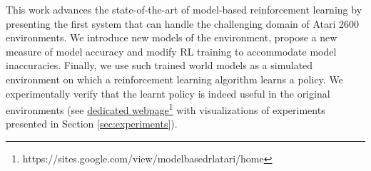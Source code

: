This work advances the state-of-the-art of model-based reinforcement learning by presenting the first system that can handle the challenging domain of Atari 2600 environments. We introduce new models of the environment, propose a new measure of model accuracy and modify RL training to accommodate model inaccuracies. Finally, we use such trained world models as a simulated environment on which a reinforcement learning algorithm learns a policy. We experimentally verify that the learnt policy is indeed useful in the original environments (see \href{https://sites.google.com/view/modelbasedrlatari/home}{dedicated webpage\footnote{\url{https://sites.google.com/view/modelbasedrlatari/home}} with visualizations} of experiments presented in Section \ref{sec:experiments}). 


